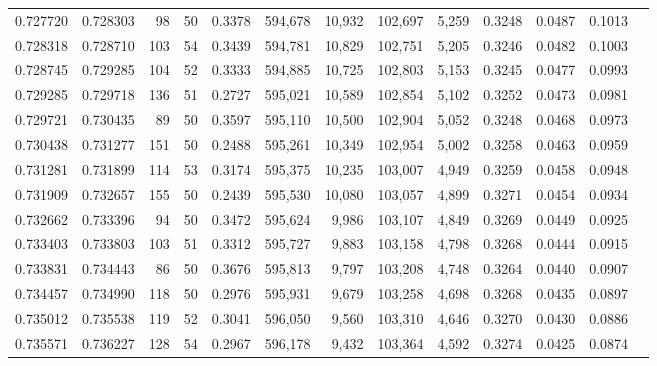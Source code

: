 \begin{tabular}{rrrrrrrrrrrrr}
0.727720 & 0.728303 &    98 &  50 &                                     0.3378 & 594,678 &  10,932 & 102,697 &   5,259 & 0.3248 & 0.0487 & 0.1013 \\
0.728318 & 0.728710 &   103 &  54 &                                     0.3439 & 594,781 &  10,829 & 102,751 &   5,205 & 0.3246 & 0.0482 & 0.1003 \\
0.728745 & 0.729285 &   104 &  52 &                                     0.3333 & 594,885 &  10,725 & 102,803 &   5,153 & 0.3245 & 0.0477 & 0.0993 \\
0.729285 & 0.729718 &   136 &  51 &                                     0.2727 & 595,021 &  10,589 & 102,854 &   5,102 & 0.3252 & 0.0473 & 0.0981 \\
0.729721 & 0.730435 &    89 &  50 &                                     0.3597 & 595,110 &  10,500 & 102,904 &   5,052 & 0.3248 & 0.0468 & 0.0973 \\
0.730438 & 0.731277 &   151 &  50 &                                     0.2488 & 595,261 &  10,349 & 102,954 &   5,002 & 0.3258 & 0.0463 & 0.0959 \\
0.731281 & 0.731899 &   114 &  53 &                                     0.3174 & 595,375 &  10,235 & 103,007 &   4,949 & 0.3259 & 0.0458 & 0.0948 \\
0.731909 & 0.732657 &   155 &  50 &                                     0.2439 & 595,530 &  10,080 & 103,057 &   4,899 & 0.3271 & 0.0454 & 0.0934 \\
0.732662 & 0.733396 &    94 &  50 &                                     0.3472 & 595,624 &   9,986 & 103,107 &   4,849 & 0.3269 & 0.0449 & 0.0925 \\
0.733403 & 0.733803 &   103 &  51 &                                     0.3312 & 595,727 &   9,883 & 103,158 &   4,798 & 0.3268 & 0.0444 & 0.0915 \\
0.733831 & 0.734443 &    86 &  50 &                                     0.3676 & 595,813 &   9,797 & 103,208 &   4,748 & 0.3264 & 0.0440 & 0.0907 \\
0.734457 & 0.734990 &   118 &  50 &                                     0.2976 & 595,931 &   9,679 & 103,258 &   4,698 & 0.3268 & 0.0435 & 0.0897 \\
0.735012 & 0.735538 &   119 &  52 &                                     0.3041 & 596,050 &   9,560 & 103,310 &   4,646 & 0.3270 & 0.0430 & 0.0886 \\
0.735571 & 0.736227 &   128 &  54 &                                     0.2967 & 596,178 &   9,432 & 103,364 &   4,592 & 0.3274 & 0.0425 & 0.0874 \\

\end{tabular}
